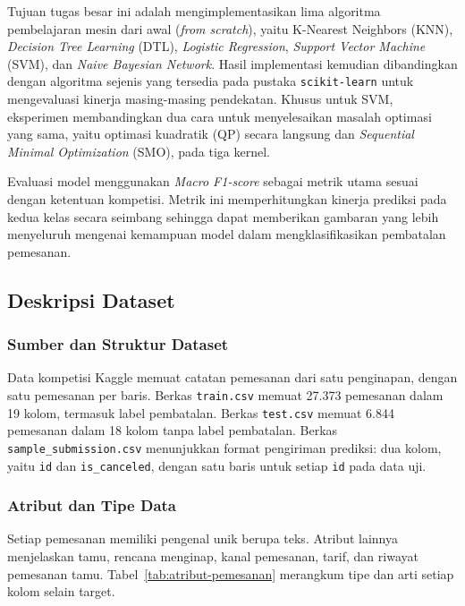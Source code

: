 Tujuan tugas besar ini adalah mengimplementasikan lima algoritma pembelajaran
mesin dari awal (\textit{from scratch}), yaitu K-Nearest Neighbors (KNN),
\textit{Decision Tree Learning} (DTL), \textit{Logistic Regression},
\textit{Support Vector Machine} (SVM),
dan \textit{Naive Bayesian Network}. Hasil implementasi kemudian dibandingkan
dengan algoritma sejenis yang tersedia pada pustaka \texttt{scikit-learn} untuk
mengevaluasi kinerja masing-masing pendekatan.
Khusus untuk SVM, eksperimen membandingkan dua cara untuk menyelesaikan
masalah optimasi yang sama, yaitu optimasi kuadratik (QP) secara langsung
dan \textit{Sequential Minimal Optimization} (SMO), pada tiga kernel.

Evaluasi model menggunakan \textit{Macro F1-score} sebagai metrik utama sesuai
dengan ketentuan kompetisi. Metrik ini memperhitungkan kinerja prediksi pada
kedua kelas secara seimbang sehingga dapat memberikan gambaran yang lebih
menyeluruh mengenai kemampuan model dalam mengklasifikasikan pembatalan
pemesanan.

\subsection{Deskripsi Dataset}

\subsubsection{Sumber dan Struktur Dataset}
Data kompetisi Kaggle memuat catatan pemesanan dari satu penginapan, dengan satu
pemesanan per baris. Berkas \texttt{train.csv} memuat 27.373 pemesanan dalam 19
kolom, termasuk label pembatalan. Berkas \texttt{test.csv} memuat 6.844
pemesanan dalam 18 kolom tanpa label pembatalan. Berkas
\texttt{sample\_submission.csv} menunjukkan format pengiriman prediksi: dua
kolom, yaitu \texttt{id} dan \texttt{is\_canceled}, dengan satu baris untuk
setiap \texttt{id} pada data uji.

\subsubsection{Atribut dan Tipe Data}
Setiap pemesanan memiliki pengenal unik berupa teks. Atribut lainnya menjelaskan
tamu, rencana menginap, kanal pemesanan, tarif, dan riwayat pemesanan tamu.
Tabel~\ref{tab:atribut-pemesanan} merangkum tipe dan arti setiap kolom selain
target.


